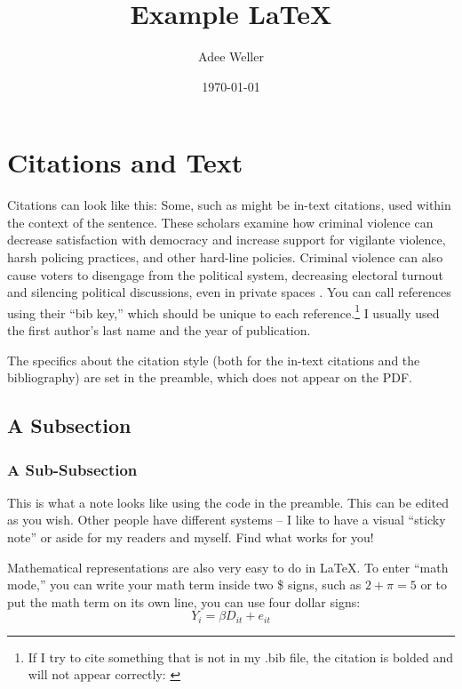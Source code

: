 \documentclass[12pt, letterpaper]{article}
\title{Example \LaTeX}
\author{Adee Weller}
\date{\today}
\newenvironment{note}{ 
\def\FrameCommand{\hspace{-2em}
\begin{sideways}
\textcolor{orange}{\textsf{\small NOTE}}
\end{sideways}
\hspace{0.5em}\textcolor{orange}{\vrule width 0.5pt} \hspace{0.5em}}\MakeFramed {\advance\hsize-\width \FrameRestore}}
{\endMakeFramed}
\begin{document}
\maketitle




\section{Citations and Text}

Citations can look like this: Some, such as \textcite{bateson2012,curtice2020,Hiskey2020} might be in-text citations, used within the context of the sentence. These scholars examine how criminal violence can decrease satisfaction with democracy and increase support for vigilante violence, harsh policing practices, and other hard-line policies. Criminal violence can also cause voters to disengage from the political system, decreasing electoral turnout and silencing political discussions, even in private spaces \citep{trejo2020}. You can call references using their ``bib key,'' which should be unique to each reference.\footnote{If I try to cite something that is not in my .bib file, the citation is bolded and will not appear correctly: \textcite{acemoglu2023}} I usually used the first author's last name and the year of publication. 

The specifics about the citation style (both for the in-text citations and the bibliography) are set in the preamble, which does not appear on the PDF. 




\subsection{A Subsection}

\subsubsection{A Sub-Subsection}

\begin{note}
   This is what a note looks like using the code in the preamble. This can be edited as you wish. Other people have different systems -- I like to have a visual ``sticky note'' or aside for my readers and myself. Find what works for you!
\end{note}


Mathematical representations are also very easy to do in \LaTeX. To enter ``math mode,'' you can write your math term inside two \$ signs, such as $2+\pi=5$ or to put the math term on its own line, you can use four dollar signs:
$$Y_i = \beta D_{it} + e_{it}$$
\end{document}
